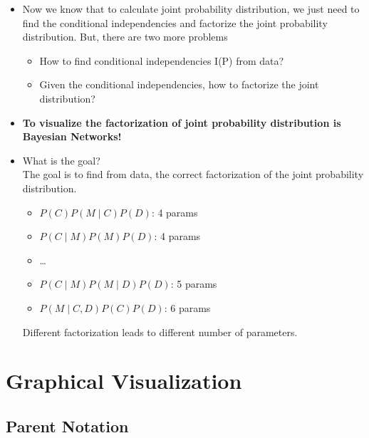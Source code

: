 \documentclass[11pt,a4paper]{report}
\begin{document}
\begin{itemize}
    \item Now we know that to calculate joint probability distribution, we just need to find the conditional independencies and factorize the joint probability distribution. But, there are two more problems

\begin{itemize}
    \item How to find conditional independencies I(P) from data?
    \item Given the conditional independencies, how to factorize the joint distribution?
\end{itemize}

\item \textbf{To visualize the factorization of joint probability distribution is Bayesian Networks!}

\item What is the goal?\\
The goal is to find from data, the correct factorization of the joint probability distribution.

\begin{itemize}
    \item $P(C)P(M \mid C)P(D)$: 4 params
    \item $P(C \mid M)P(M)P(D)$: 4 params
    \item \ldots
    \item $P(C \mid M)P(M \mid D)P(D)$: 5 params
    \item $P(M \mid C, D)P(C)P(D)$: 6 params
\end{itemize}

Different factorization leads to different number of parameters.
\end{itemize}


\chapter{Graphical Visualization}

\section{Parent Notation}
\end{document}

